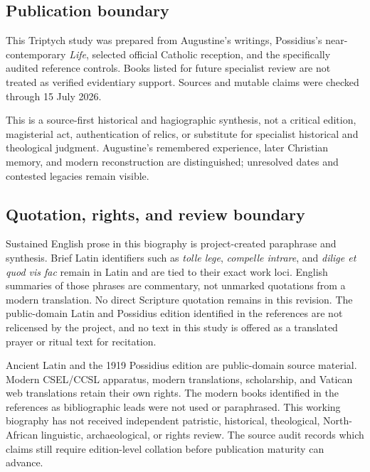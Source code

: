 \subsection{Publication boundary}

This Triptych study was prepared from Augustine's writings, Possidius's
near-contemporary \emph{Life}, selected official Catholic reception, and the
specifically audited reference controls. Books listed for future specialist
review are not treated as verified evidentiary support. Sources and mutable
claims were checked through 15 July 2026.

This is a source-first historical and hagiographic synthesis, not a critical
edition, magisterial act, authentication of relics, or substitute for
specialist historical and theological judgment. Augustine's remembered
experience, later Christian memory, and modern reconstruction are
distinguished; unresolved dates and contested legacies remain visible.

\subsection{Quotation, rights, and review boundary}

Sustained English prose in this biography is project-created paraphrase and
synthesis. Brief Latin identifiers such as \emph{tolle lege}, \emph{compelle
intrare}, and \emph{dilige et quod vis fac} remain in Latin and are tied to
their exact work loci. English summaries of those phrases are commentary, not
unmarked quotations from a modern translation. No direct Scripture quotation
remains in this revision. The public-domain Latin and Possidius edition
identified in the references are not relicensed by the project, and no text in
this study is offered as a translated prayer or ritual text for recitation.

Ancient Latin and the 1919 Possidius edition are public-domain source material.
Modern CSEL/CCSL apparatus, modern translations, scholarship, and Vatican web
translations retain their own rights. The modern books identified in the
references as bibliographic leads were not used or paraphrased. This working
biography has not received independent patristic, historical, theological,
North-African linguistic, archaeological, or rights review. The source audit
records which claims still require edition-level collation before publication
maturity can advance.
